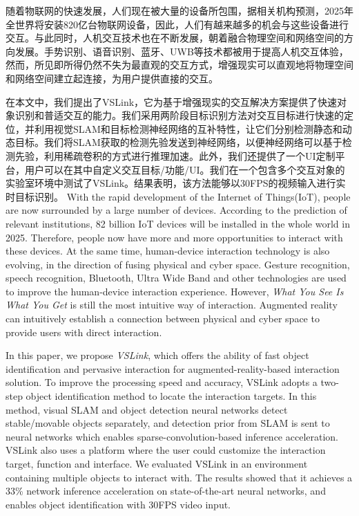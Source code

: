 \cleardoublepage
{}
随着物联网的快速发展，人们现在被大量的设备所包围，据相关机构预测，2025年全世界将安装820亿台物联网设备，因此，人们有越来越多的机会与这些设备进行交互。与此同时，人机交互技术也在不断发展，朝着融合物理空间和网络空间的方向发展。手势识别、语音识别、蓝牙、UWB等技术都被用于提高人机交互体验，然而，所见即所得仍然不失为最直观的交互方式，增强现实可以直观地将物理空间和网络空间建立起连接，为用户提供直接的交互。

在本文中，我们提出了VSLink，它为基于增强现实的交互解决方案提供了快速对象识别和普适交互的能力。我们采用两阶段目标识别方法对交互目标进行快速的定位，并利用视觉SLAM和目标检测神经网络的互补特性，让它们分别检测静态和动态目标。我们将SLAM获取的检测先验发送到神经网络，以便神经网络可以基于检测先验，利用稀疏卷积的方式进行推理加速。此外，我们还提供了一个UI定制平台，用户可以在其中自定义交互目标/功能/UI。我们在一个包含多个交互对象的实验室环境中测试了VSLink。结果表明，该方法能够以30FPS的视频输入进行实时目标识别。
\cleardoublepage
{}
With the rapid development of the Internet of Things(IoT), people are now surrounded by a large number of devices. According to the prediction of relevant institutions, 82 billion IoT devices will be installed in the whole world in 2025. Therefore, people now have more and more opportunities to interact with these devices. At the same time, human-device interaction technology is also evolving, in the direction of fusing physical and cyber space. Gesture recognition, speech recognition, Bluetooth, Ultra Wide Band and other technologies are used to improve the human-device interaction experience. However, \textit{What You See Is What You Get} is still the most intuitive way of interaction. Augmented reality can intuitively establish a connection between physical and cyber space to provide users with direct interaction. 

In this paper, we propose \textit{VSLink}, which offers the ability of fast object identification and pervasive interaction for augmented-reality-based interaction solution.
To improve the processing speed and accuracy, VSLink adopts a two-step object identification method to locate the interaction targets.
In this method, visual SLAM and object detection neural networks detect stable/movable objects separately, and detection prior from SLAM is sent to neural networks which enables sparse-convolution-based inference acceleration.
VSLink also uses a platform where the user could customize the interaction target, function and interface.
We evaluated VSLink in an environment containing multiple objects to interact with. 
The results showed that it achieves a 33\% network inference acceleration on state-of-the-art neural networks, and enables object identification with 30FPS video input.
